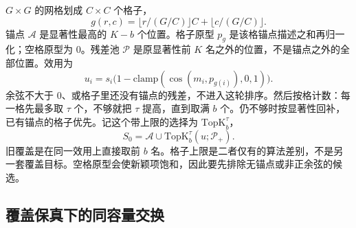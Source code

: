 $G\times G$ 的网格划成 $C\times C$ 个格子，
\begin{equation}
g(r,c)=\bigl\lfloor r/(G/C)\bigr\rfloor C+\bigl\lfloor c/(G/C)\bigr\rfloor.
\label{eq:cell}
\end{equation}
锚点 $\mathcal{A}$ 是显著性最高的 $K-b$ 个位置。格子原型 $p_g$ 是该格锚点描述之和再归一化；空格原型为 $0$。残差池 $\mathcal{P}$ 是原显著性前 $K$ 名之外的位置，不是锚点之外的全部位置。效用为
\begin{equation}
u_i=s_i\bigl(1-\mathrm{clamp}(\cos(m_i,p_{g(i)}),0,1)\bigr).
\label{eq:util}
\end{equation}
余弦不大于 $0$、或格子里还没有锚点的残差，不进入这轮排序。然后按格计数：每一格先最多取 $\tau$ 个，不够就把 $\tau$ 提高，直到取满 $b$ 个。仍不够时按显著性回补，已有锚点的格子优先。记这个带上限的选择为 $\mathrm{TopK}_b^{\tau}$，
\begin{equation}
S_0=\mathcal{A}\cup\mathrm{TopK}_b^{\tau}(u;\mathcal{P}_{+}).
\label{eq:basis}
\end{equation}
旧覆盖是在同一效用上直接取前 $b$ 名。格子上限是二者仅有的算法差别，不是另一套覆盖目标。空格原型会使新颖项饱和，因此要先排除无锚点或非正余弦的候选。

\subsection{覆盖保真下的同容量交换}
\label{sec:swap}

